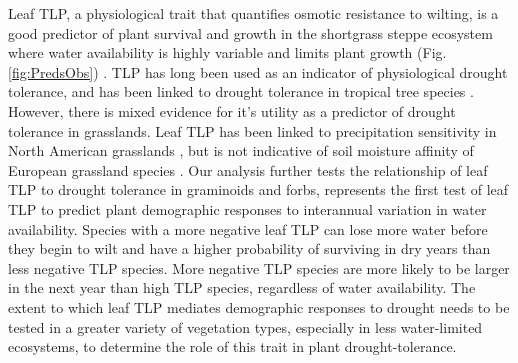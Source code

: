 \documentclass[12pt, letterpaper]{article}
\begin{document}
Leaf TLP, a physiological trait that quantifies osmotic resistance to wilting, is a good predictor of plant survival and growth in the shortgrass steppe ecosystem where water availability is highly variable and limits plant growth (Fig. \ref{fig:PredsObs}) \citep{Lauenroth1992Long-TermSteppe}. TLP has long been used as an indicator of physiological drought tolerance, and has been linked to drought tolerance in tropical tree species \citep{Bartlett2012}. However, there is mixed evidence for it’s utility as a predictor of drought tolerance in grasslands. Leaf TLP has been linked to precipitation sensitivity in North American grasslands \citep{Griffin-Nolan2019, Blumenthal2020, Wilcox2020PlantPrairie}, but is not indicative of soil moisture affinity of European grassland species \citep{Majekova2014PlantStability}. Our analysis further tests the relationship of leaf TLP to drought tolerance in graminoids and forbs, represents the first test of leaf TLP to predict plant demographic responses to interannual variation in water availability. Species with a more negative leaf TLP can lose more water before they begin to wilt and have a higher probability of surviving in dry years than less negative TLP species. More negative TLP species are more likely to be larger in the next year than high TLP species, regardless of water availability. The extent to which leaf TLP mediates demographic responses to drought needs to be tested in a greater variety of vegetation types, especially in less water-limited ecosystems, to determine the role of this trait in plant drought-tolerance.
\end{document}
